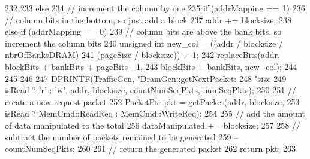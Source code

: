\begin{DoxyCode}
{{{232         }
233     } else {
234         // increment the column by one
235         if (addrMapping == 1)
236             // column bits in the bottom, so just add a block
237             addr += blocksize;
238         else if (addrMapping == 0) {
239             // column bits are above the bank bits, so increment the column bits
240             unsigned int new_col = ((addr / blocksize / nbrOfBanksDRAM) %
241                                     (pageSize / blocksize)) + 1;
242             replaceBits(addr, blockBits + bankBits + pageBits - 1,
243                         blockBits + bankBits, new_col);
244         }
245     }
246 
247     DPRINTF(TrafficGen, "DramGen::getNextPacket: %
248             "size %
249             isRead ? 'r' : 'w', addr, blocksize, countNumSeqPkts, numSeqPkts);
250 
251     // create a new request packet
252     PacketPtr pkt = getPacket(addr, blocksize,
253                               isRead ? MemCmd::ReadReq : MemCmd::WriteReq);
254 
255     // add the amount of data manipulated to the total
256     dataManipulated += blocksize;
257 
258     // subtract the number of packets remained to be generated
259     --countNumSeqPkts;
260 
261     // return the generated packet
262     return pkt;
263 }
\end{DoxyCode}


